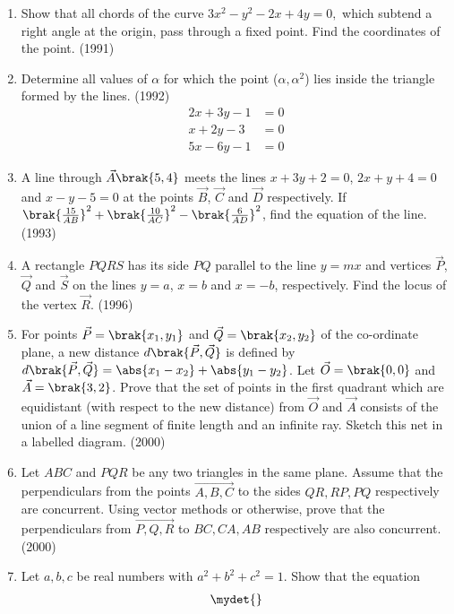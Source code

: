 \begin{enumerate}
\begin{center}
\end{center}
%	
\item Show that all chords of  the curve $ 3x^2-y^2-2x+4y=0,$ which subtend a right angle at the origin, pass through a fixed point. Find the coordinates of the point.     \hfill{(1991)}
%
\item Determine all values of $\alpha$ for which the point ($\alpha , \alpha^2$) lies inside the triangle formed by the lines.  \hfill{(1992)}
	\begin{align*}  2x+3y-1&=0\\ 
	x+2y-3&=0  \\ 5x-6y-1&=0   \end{align*}
%
\item A line through $\vec{A} \brak{5, 4}$ meets the lines $x+3y+2=0$, $2x+y+4=0$ and $x-y-5=0$ at the points $\vec{B}$, $\vec{C}$ and $\vec{D}$ respectively. If $\brak{\frac{15}{AB}}^{2}+\brak{\frac{10}{AC}}^{2}-\brak{\frac{6}{AD}}^{2}$, find the equation of the line.
	\hfill{(1993)}
%
\item A rectangle $PQRS$ has its side $PQ$ parallel to the line $y=mx$ 
	and vertices $\vec{P}$, $\vec{Q}$ and $\vec{S}$ on the lines $y=a$, $x=b$ and $x=-b$, 
		respectively. Find the locus of the vertex $\vec{R}$.
		\hfill{(1996)}
%
\item For points $\vec{P}=\brak{x_{1}, y_{1}}$ and $\vec{Q}=\brak{x_{2}, y_{2}}$ of the co-ordinate plane, a new distance $d\brak{\vec{P}, \vec{Q}}$ is defined by $d\brak{\vec{P}, \vec{Q}}=\abs{x_{1}-x_{2}}+\abs{y_{1}-y_{2}}$. Let $\vec{O}=\brak{0, 0}$ and $\vec{A}=\brak{3, 2}$. Prove that the set of points in the first quadrant which are equidistant (with respect to the new distance) from $\vec{O}$ and $\vec{A}$ consists of the union of a line segment of finite length and an infinite ray. Sketch this net in a labelled diagram.
	\hfill{(2000)}
%
\item Let $ABC$ and $PQR$ be any two triangles in the same plane.
	Assume that the perpendiculars from the points $\vec{A, B, C}$ to 
		the sides $QR, RP, PQ$ respectively are concurrent. Using vector methods or otherwise, prove that the perpendiculars from $\vec{P, Q, R}$ to $BC, CA, AB$ respectively are also concurrent. 
	\hfill{(2000)}
%
\item Let $a, b, c$ be real numbers with $a^{2}+b^{2}+c^{2}=1$. Show that the equation 
	\begin{align*}
		\mydet{
}
\end{align*}
\end{enumerate}
